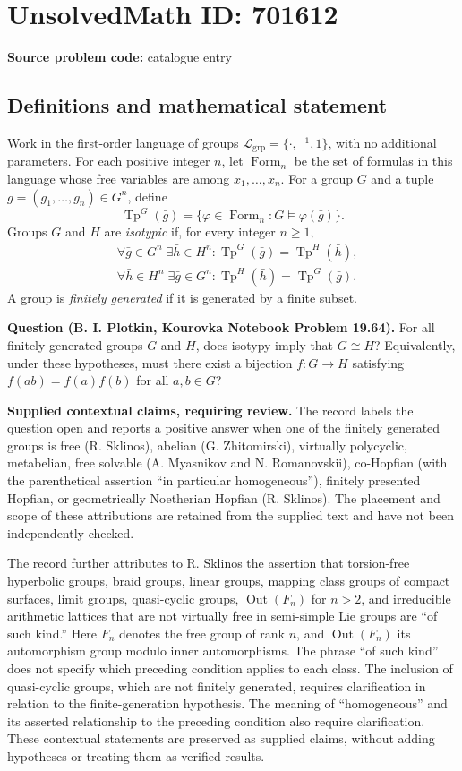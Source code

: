 \documentclass[11pt]{article}
\begin{document}
\section*{UnsolvedMath ID: 701612}
\textbf{Source problem code:} catalogue entry
\subsection{Definitions and mathematical statement}
Work in the first-order language of groups \(\mathcal L_{\mathrm{grp}}=\{\cdot,{}^{-1},1\}\), with no additional parameters. For each positive integer \(n\), let \(\operatorname{Form}_n\) be the set of formulas in this language whose free variables are among \(x_1,\ldots,x_n\). For a group \(G\) and a tuple \(\bar g=(g_1,\ldots,g_n)\in G^n\), define
\[
\operatorname{Tp}^{G}(\bar g)=\{\varphi\in\operatorname{Form}_n:G\models\varphi(\bar g)\}.
\]
Groups \(G\) and \(H\) are \emph{isotypic} if, for every integer \(n\geq 1\),
\[
\begin{aligned}
&\forall\bar g\in G^n\;\exists\bar h\in H^n:
\operatorname{Tp}^{G}(\bar g)=\operatorname{Tp}^{H}(\bar h),\\
&\forall\bar h\in H^n\;\exists\bar g\in G^n:
\operatorname{Tp}^{H}(\bar h)=\operatorname{Tp}^{G}(\bar g).
\end{aligned}
\]
A group is \emph{finitely generated} if it is generated by a finite subset.

\textbf{Question (B. I. Plotkin, Kourovka Notebook Problem 19.64).} For all finitely generated groups \(G\) and \(H\), does isotypy imply that \(G\cong H\)? Equivalently, under these hypotheses, must there exist a bijection \(f:G\to H\) satisfying \(f(ab)=f(a)f(b)\) for all \(a,b\in G\)?

\textbf{Supplied contextual claims, requiring review.} The record labels the question open and reports a positive answer when one of the finitely generated groups is free (R. Sklinos), abelian (G. Zhitomirski), virtually polycyclic, metabelian, free solvable (A. Myasnikov and N. Romanovskii), co-Hopfian (with the parenthetical assertion ``in particular homogeneous''), finitely presented Hopfian, or geometrically Noetherian Hopfian (R. Sklinos). The placement and scope of these attributions are retained from the supplied text and have not been independently checked.

The record further attributes to R. Sklinos the assertion that torsion-free hyperbolic groups, braid groups, linear groups, mapping class groups of compact surfaces, limit groups, quasi-cyclic groups, \(\operatorname{Out}(F_n)\) for \(n>2\), and irreducible arithmetic lattices that are not virtually free in semi-simple Lie groups are ``of such kind.'' Here \(F_n\) denotes the free group of rank \(n\), and \(\operatorname{Out}(F_n)\) its automorphism group modulo inner automorphisms. The phrase ``of such kind'' does not specify which preceding condition applies to each class. The inclusion of quasi-cyclic groups, which are not finitely generated, requires clarification in relation to the finite-generation hypothesis. The meaning of ``homogeneous'' and its asserted relationship to the preceding condition also require clarification. These contextual statements are preserved as supplied claims, without adding hypotheses or treating them as verified results.
\end{document}
